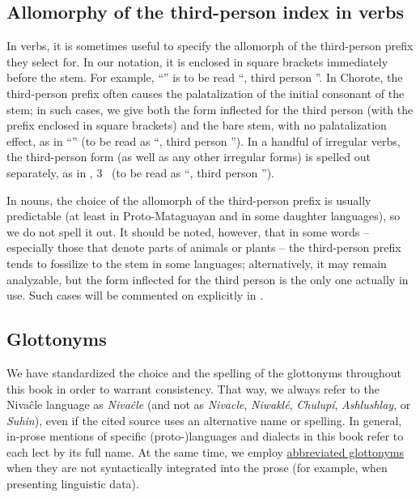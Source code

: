 \subsection{Allomorphy of the third-person index in verbs}

In verbs, it is sometimes useful to specify the allomorph of the third-person prefix they select for. In our notation, it is enclosed in square brackets immediately before the stem. For example, “” is to be read “, third person ”. In Chorote, the third-person prefix  often causes the palatalization of the initial consonant of the stem; in such cases, we give both the form inflected for the third person (with the prefix enclosed in square brackets) and the bare stem, with no palatalization effect, as in “” (to be read as “, third person ”). In a handful of irregular verbs, the third-person form (as well as any other irregular forms) is spelled out separately, as in , 3~ (to be read as “, third person ”).

In nouns, the choice of the allomorph of the third-person prefix is usually predictable (at least in Proto-Mataguayan and in some daughter languages), so we do not spell it out. It should be noted, however, that in some words -- especially those that denote parts of animals or plants -- the third-person prefix tends to fossilize to the stem in some languages; alternatively, it may remain analyzable, but the form inflected for the third person is the only one actually in use. Such cases will be commented on explicitly in .

\subsection{Glottonyms}

We have standardized the choice and the spelling of the glottonyms throughout this book in order to warrant consistency. That way, we always refer to the Nivaĉle language as \emph{Nivaĉle} (and not as \emph{Nivacle}, \emph{Niwaklé}, \emph{Chulupí}, \emph{Ashlushlay}, or \emph{Suhin}), even if the cited source uses an alternative name or spelling. In general, in-prose mentions of specific (proto-)languages and dialects in this book refer to each lect by its full name. At the same time, we employ \hyperref[abbr]{abbreviated glottonyms} when they are not syntactically integrated into the prose (for example, when presenting linguistic data).


